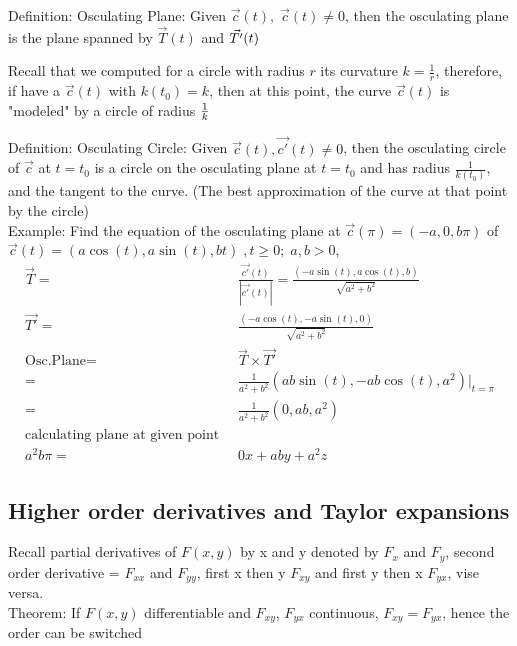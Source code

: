 \documentclass{article}
\begin{document}
        Definition: Osculating Plane: Given $\vec{c}(t),\;\vec{c}(t)\neq0$, then the osculating plane is the plane spanned by $\vec{T}(t)$ and $\vec{T'}(t)\\$
        
        Recall that we computed for a circle with radius $r$ its curvature $k = \frac{1}{r}$, therefore, if have a $\vec{c}(t)$ with $k(t_0) = k$, then at this point, the curve $\vec{c}(t)$ is "modeled" by a circle of radius $\frac{1}{k}\\$
        
        Definition: Osculating Circle: Given $\vec{c}(t), \vec{c'}(t)\neq0$, then the osculating circle of $\vec{c}$ at $t=t_0$ is a circle on the osculating plane at $t=t_0$ and has radius $\frac{1}{k(t_0)}$, and the tangent to the curve. (The best approximation of the curve at that point by the circle)\\
        
        Example: Find the equation of the osculating plane at $\vec{c}(\pi) = (-a,0,b\pi)$ of $\vec{c}(t) = (a\cos(t), a\sin(t), bt)\;,t\geq0;\;a,b>0$, 
        \begin{align}
            \vec{T}=&\frac{\vec{c'}(t)}{|\vec{c'}(t)|}=\frac{(-a\sin(t), a\cos(t), b)}{\sqrt{a^2 + b^2}}\\
            \vec{T'} =& \frac{(-a\cos(t), -a\sin(t), 0)}{\sqrt{a^2 + b^2}}\\
            \text{Osc.Plane} =& \vec{T}\times\vec{T'}\\
            =& \frac{1}{a^2+b^2} (ab\sin(t), -ab\cos(t),a^2)|_{t=\pi}\\
            =& \frac{1}{a^2+b^2}(0,ab,a^2)\\
            \text{calculating plane at given point}\;\;&\nonumber\\
            a^2b\pi =& 0x + aby + a^2z
        \end{align}
    \subsection{Higher order derivatives and Taylor expansions}
        Recall partial derivatives of $F(x,y)$ by x and y denoted by $F_x$ and $F_y$, second order derivative = $F_{xx}$ and $F_{yy}$, first x then y $F_{xy}$ and first y then x $F_{yx}$, vise versa. \\
        
        Theorem: If $F(x,y)$ differentiable and $F_{xy}$, $F_{yx}$ continuous, $F_{xy}=F_{yx}$, hence the order can be switched\\
        
\end{document}
